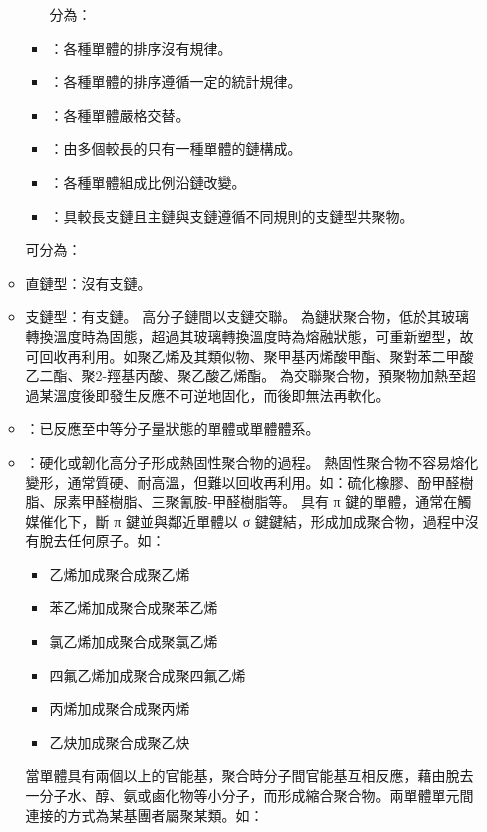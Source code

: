 \documentclass[a4paper,12pt]{report}
\begin{document}
\begin{itemize}
\begin{itemize}
\begin{itemize}
分為：
\bit
\item {}：各種單體的排序沒有規律。
\item {}：各種單體的排序遵循一定的統計規律。
\item {}：各種單體嚴格交替。
\item {}：由多個較長的只有一種單體的鏈構成。
\item {}：各種單體組成比例沿鏈改變。
\item {}：具較長支鏈且主鏈與支鏈遵循不同規則的支鏈型共聚物。
\end{itemize}
可分為：
\bit
\item 直鏈型：沒有支鏈。
\item 支鏈型：有支鏈。
\eit
{}
高分子鏈間以支鏈交聯。
為鏈狀聚合物，低於其玻璃轉換溫度時為固態，超過其玻璃轉換溫度時為熔融狀態，可重新塑型，故可回收再利用。如聚乙烯及其類似物、聚甲基丙烯酸甲酯、聚對苯二甲酸乙二酯、聚2-羥基丙酸、聚乙酸乙烯酯。
為交聯聚合物，預聚物加熱至超過某溫度後即發生反應不可逆地固化，而後即無法再軟化。
\bit
\item {}：已反應至中等分子量狀態的單體或單體體系。
\item {}：硬化或韌化高分子形成熱固性聚合物的過程。
\eit
熱固性聚合物不容易熔化變形，通常質硬、耐高溫，但難以回收再利用。如：硫化橡膠、酚甲醛樹脂、尿素甲醛樹脂、三聚氰胺-甲醛樹脂等。
具有 π 鍵的單體，通常在觸媒催化下，斷 π 鍵並與鄰近單體以 σ 鍵鍵結，形成加成聚合物，過程中沒有脫去任何原子。如：
\begin{itemize}
\item 乙烯加成聚合成聚乙烯
\item 苯乙烯加成聚合成聚苯乙烯
\item 氯乙烯加成聚合成聚氯乙烯
\item 四氟乙烯加成聚合成聚四氟乙烯
\item 丙烯加成聚合成聚丙烯
\item 乙炔加成聚合成聚乙炔
\end{itemize}
當單體具有兩個以上的官能基，聚合時分子間官能基互相反應，藉由脫去一分子水、醇、氨或鹵化物等小分子，而形成縮合聚合物。兩單體單元間連接的方式為某基團者屬聚某類。如：
\bit

\end{itemize}
\end{itemize}
\end{document}
